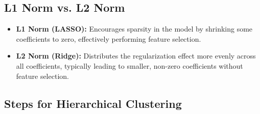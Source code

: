 \documentclass[oneside,solution]{seu-ml-assign}
\begin{document}
\subsection{L1 Norm vs. L2 Norm}
\begin{itemize}
    \item \textbf{L1 Norm (LASSO):} Encourages sparsity in the model by shrinking some coefficients to zero, effectively performing feature selection.
    \item \textbf{L2 Norm (Ridge):} Distributes the regularization effect more evenly across all coefficients, typically leading to smaller, non-zero coefficients without feature selection.
\end{itemize}








\subsection{Steps for Hierarchical Clustering}
\end{document}
